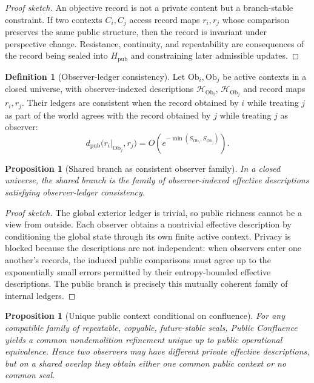 \documentclass[11pt]{article}
\theoremstyle{plain}
\newtheorem{proposition}[theorem]{Proposition}
\theoremstyle{definition}
\newtheorem{definition}[theorem]{Definition}
\theoremstyle{remark}
\newenvironment{proofsketch}{\begin{proof}[Proof sketch]}{\end{proof}}
\begin{document}
\begin{proofsketch}
An objective record is not a private content but a branch-stable constraint. If two contexts \(C_i,C_j\) access record maps \(r_i,r_j\) whose comparison preserves the same public structure, then the record is invariant under perspective change. Resistance, continuity, and repeatability are consequences of the record being sealed into \(H_{\mathrm{pub}}\) and constraining later admissible updates.
\end{proofsketch}

\begin{definition}[Observer-ledger consistency]
Let \(\mathrm{Ob}_i,\mathrm{Ob}_j\) be active contexts in a closed universe, with observer-indexed descriptions \(\mathcal{H}_{\mathrm{Ob}_i}\), \(\mathcal{H}_{\mathrm{Ob}_j}\) and record maps \(r_i,r_j\). Their ledgers are consistent when the record obtained by \(i\) while treating \(j\) as part of the world agrees with the record obtained by \(j\) while treating \(j\) as observer:
\[
d_{\mathrm{pub}}\bigl(r_i|_{\mathrm{Ob}_j},r_j\bigr)
=O(e^{-\min(S_{\mathrm{Ob}_i},S_{\mathrm{Ob}_j})}).
\]
\end{definition}

\begin{proposition}[Shared branch as consistent observer family]
In a closed universe, the shared branch is the family of observer-indexed effective descriptions satisfying observer-ledger consistency.
\end{proposition}

\begin{proofsketch}
The global exterior ledger is trivial, so public richness cannot be a view from outside. Each observer obtains a nontrivial effective description by conditioning the global state through its own finite active context. Privacy is blocked because the descriptions are not independent: when observers enter one another's records, the induced public comparisons must agree up to the exponentially small errors permitted by their entropy-bounded effective descriptions. The public branch is precisely this mutually coherent family of internal ledgers.
\end{proofsketch}

\begin{proposition}[Unique public context conditional on confluence]
For any compatible family of repeatable, copyable, future-stable seals, Public Confluence yields a common nondemolition refinement unique up to public operational equivalence. Hence two observers may have different private effective descriptions, but on a shared overlap they obtain either one common public context or no common seal.
\end{proposition}
\end{document}
